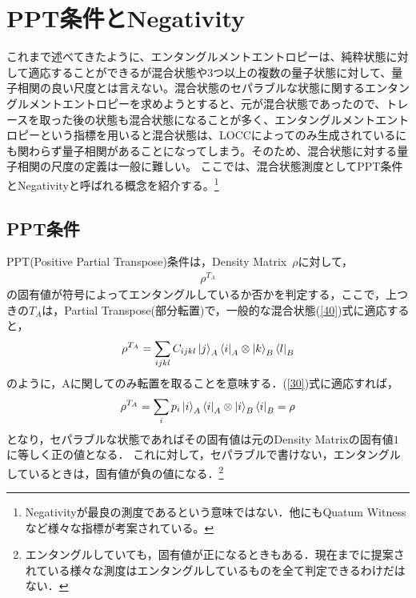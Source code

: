 \section{PPT条件とNegativity}
これまで述べてきたように、エンタングルメントエントロピーは、純粋状態に対して適応することができるが混合状態や3つ以上の複数の量子状態に対して、量子相関の良い尺度とは言えない。混合状態のセパラブルな状態に関するエンタングルメントエントロピーを求めようとすると、元が混合状態であったので、トレースを取った後の状態も混合状態になることが多く、エンタングルメントエントロピーという指標を用いると混合状態は、LOCCによってのみ生成されているにも関わらず量子相関があることになってしまう。そのため、混合状態に対する量子相関の尺度の定義は一般に難しい。
ここでは、混合状態測度としてPPT条件とNegativityと呼ばれる概念を紹介する。\footnote{Negativityが最良の測度であるという意味ではない．他にもQuatum Witnessなど様々な指標が考案されている。}　
\subsection{PPT条件}

PPT(Positive Partial Transpose)条件は，Density Matrix\ $\rho$に対して，
\begin{eqnarray}
\label{5}
\rho^{T_{A}}
\end{eqnarray}
の固有値が符号によってエンタングルしているか否かを判定する，ここで，上つきの$T_{A}$は，Partial Transpose(部分転置)で，一般的な混合状態(\ref{40})式に適応すると，
\begin{eqnarray}
\label{6}
\rho^{T_{A}}=\sum_{ijkl}C_{ijkl}\ket{j}_A\bra{i}_{A}\otimes\ket{k}_B\bra{l}_{B}
\end{eqnarray}
のように，Aに関してのみ転置を取ることを意味する．(\ref{30})式に適応すれば，
\begin{eqnarray}
\rho^{T_{A}}=\sum_{i}p_{i}\ket{i}_A\bra{i}_{A}\otimes\ket{i}_B\bra{i}_{B}=\rho
\end{eqnarray}
となり，セパラブルな状態であればその固有値は元のDensity Matrixの固有値$1$に等しく正の値となる．
これに対して，セパラブルで書けない，エンタングルしているときは，固有値が負の値になる．\footnote{エンタングルしていても，固有値が正になるときもある．現在までに提案されている様々な測度はエンタングルしているものを全て判定できるわけだはない．}
